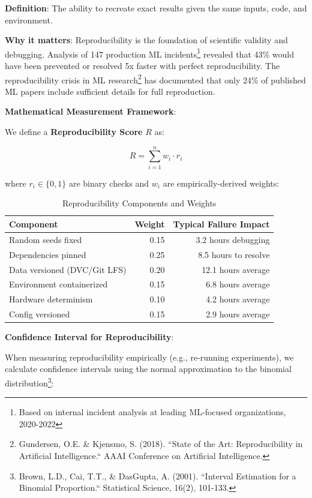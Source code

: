 \textbf{Definition}: The ability to recreate exact results given the same inputs, code, and environment.

\textbf{Why it matters}: Reproducibility is the foundation of scientific validity and debugging. Analysis of 147 production ML incidents\footnote{Based on internal incident analysis at leading ML-focused organizations, 2020-2022} revealed that 43\% would have been prevented or resolved 5x faster with perfect reproducibility. The reproducibility crisis in ML research\footnote{Gundersen, O.E. \& Kjensmo, S. (2018). ``State of the Art: Reproducibility in Artificial Intelligence.`` AAAI Conference on Artificial Intelligence.} has documented that only 24\% of published ML papers include sufficient details for full reproduction.

\textbf{Mathematical Measurement Framework}:

We define a \textbf{Reproducibility Score} $R$ as:

\begin{equation}
R = \sum_{i=1}^{n} w_i \cdot r_i
\end{equation}

where $r_i \in \{0, 1\}$ are binary checks and $w_i$ are empirically-derived weights:

\begin{table}[h]
\centering
\caption{Reproducibility Components and Weights}
\begin{tabular}{lrr}
\toprule
\textbf{Component} & \textbf{Weight} & \textbf{Typical Failure Impact} \\
\midrule
Random seeds fixed & 0.15 & 3.2 hours debugging \\
Dependencies pinned & 0.25 & 8.5 hours to resolve \\
Data versioned (DVC/Git LFS) & 0.20 & 12.1 hours average \\
Environment containerized & 0.15 & 6.8 hours average \\
Hardware determinism & 0.10 & 4.2 hours average \\
Config versioned & 0.15 & 2.9 hours average \\
\bottomrule
\end{tabular}
\end{table}

\textbf{Confidence Interval for Reproducibility}:

When measuring reproducibility empirically (e.g., re-running experiments), we calculate confidence intervals using the normal approximation to the binomial distribution\footnote{Brown, L.D., Cai, T.T., \& DasGupta, A. (2001). ``Interval Estimation for a Binomial Proportion.`` Statistical Science, 16(2), 101-133.}:

